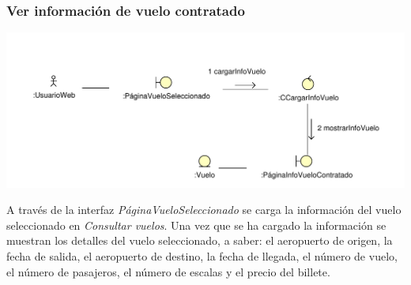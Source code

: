 \documentclass[11pt, a4paper, twoside, titlepage]{article}
\begin{document}
			\subsubsection{Ver información de vuelo contratado}
				\begin{center}
					\includegraphics[scale=.8]{analisis/diagramas/verinfovuelocontratado.pdf}
				\end{center}

					A través de la interfaz {\itshape PáginaVueloSeleccionado} se carga la información del vuelo seleccionado en  {\itshape Consultar vuelos}. Una vez que se ha cargado la información se muestran los detalles del vuelo seleccionado, a saber: el aeropuerto de origen, la fecha de salida, el aeropuerto de destino, la fecha de llegada, el número de vuelo, el número de pasajeros, el número de escalas y el precio del billete.
\end{document}
